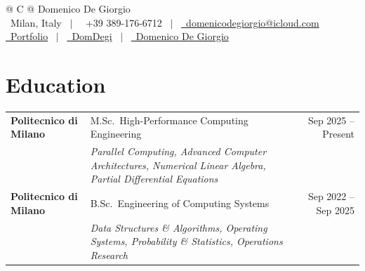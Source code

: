 \documentclass[a4paper,12pt]{article}
\begin{document}
\pagestyle{empty}

\begin{tabularx}{\linewidth}{@{} C @{}}
\LARGE{Domenico De Giorgio} \\[4pt]

\faMapMarker* \ Milan, Italy \ $|$ \
\faPhone \ +39 389-176-6712 \ $|$ \
\href{mailto:domenicodegiorgio@icloud.com}{\faEnvelope \ domenicodegiorgio@icloud.com} \\

\href{https://domdegi.github.io}{\faGlobe \ Portfolio} \ $|$ \
\href{https://github.com/DomDegi}{\faGithub \ DomDegi} \ $|$ \
\href{https://www.linkedin.com/in/domenicodegiorgio/}{\faLinkedin \ Domenico De Giorgio} \\

\end{tabularx}
\vspace{4pt}

\section{Education}
\begin{tabularx}{\linewidth}{@{}l X r@{}}
\textbf{Politecnico di Milano} & M.Sc.\ High-Performance Computing Engineering & Sep 2025 -- Present \\
& \small\textit{Parallel Computing, Advanced Computer Architectures, Numerical Linear Algebra, Partial Differential Equations} & \\[3pt]

\textbf{Politecnico di Milano} & B.Sc.\ Engineering of Computing Systems & Sep 2022 -- Sep 2025 \\
& \small\textit{Data Structures \& Algorithms, Operating Systems, Probability \& Statistics, Operations Research} & \\
\end{tabularx}

\end{document}
